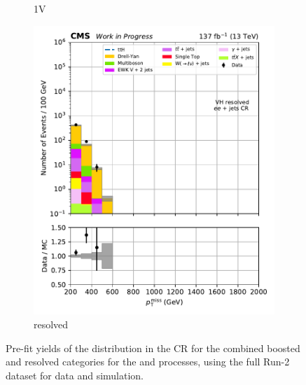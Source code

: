 \begin{figure}[htbp]
\begin{subfigure}[b]{0.24\textwidth}
        \caption{\VH 1V}
    \end{subfigure}
    \hfill
    \begin{subfigure}[b]{0.24\textwidth}
        \includegraphics[width=\textwidth]{figures/region_plots/2016to18/region_4/VH_resolved.pdf}
        \caption{\VH resolved}
    \end{subfigure}
    \caption[Pre-fit yields of the \ptmiss distribution in the \doubleEleCr control region for the combined boosted and resolved categories for the \ttH and \VH processes, using the full Run-2 dataset for data and simulation]{Pre-fit yields of the \ptmiss distribution in the \doubleEleCr \gls{CR} for the combined boosted and resolved categories for the \ttH and \VH processes, using the full Run-2 dataset for data and simulation.}
    \label{fig:htoinv_cr_yields_comb2016to18_double_electron}
\end{figure}

